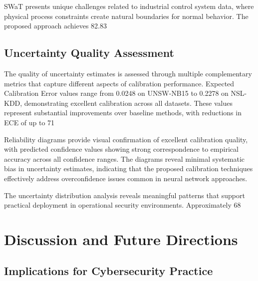 \documentclass[journal]{IEEEtran}
\begin{document}
SWaT presents unique challenges related to industrial control system data, where physical process constraints create natural boundaries for normal behavior. The proposed approach achieves 82.83%

\subsection{Uncertainty Quality Assessment}

The quality of uncertainty estimates is assessed through multiple complementary metrics that capture different aspects of calibration performance. Expected Calibration Error values range from 0.0248 on UNSW-NB15 to 0.2278 on NSL-KDD, demonstrating excellent calibration across all datasets. These values represent substantial improvements over baseline methods, with reductions in ECE of up to 71%

Reliability diagrams provide visual confirmation of excellent calibration quality, with predicted confidence values showing strong correspondence to empirical accuracy across all confidence ranges. The diagrams reveal minimal systematic bias in uncertainty estimates, indicating that the proposed calibration techniques effectively address overconfidence issues common in neural network approaches.

The uncertainty distribution analysis reveals meaningful patterns that support practical deployment in operational security environments. Approximately 68%

\section{Discussion and Future Directions}

\subsection{Implications for Cybersecurity Practice}
\end{document}
